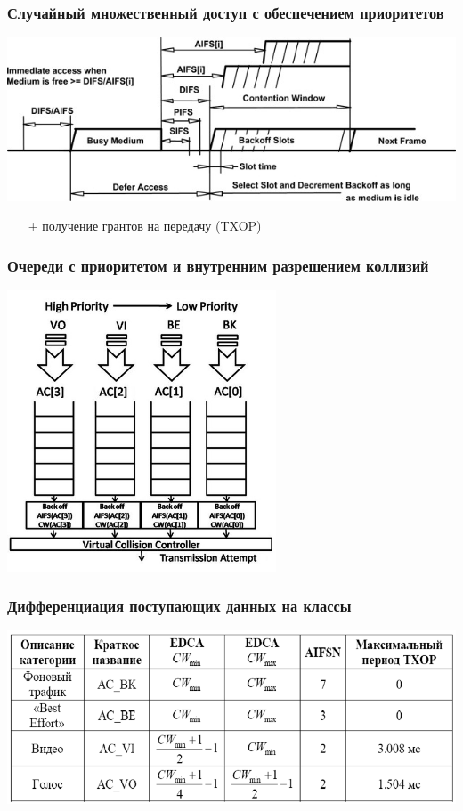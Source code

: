 \documentclass[utf8]{beamer}
\begin{document}
\begin{frame}
\frametitle{Случайный множественный доступ с обеспечением приоритетов}
\begin{center}
 \includegraphics[width=\textwidth]{pic/802-11-ifs.png}
\end{center}
\begin{itemize}
 \item [+] получение грантов на передачу (TXOP)
\end{itemize}
\end{frame}
\begin{frame}
\frametitle{Очереди с приоритетом и внутренним разрешением коллизий}
\begin{center}
 \includegraphics[width=0.6\textwidth]{pic/edca.png}
\end{center}
\end{frame}
\begin{frame}
\frametitle{Дифференциация поступающих данных на классы}
\begin{center}
 \includegraphics[width=\textwidth]{pic/access-classes.png}
\end{center}
\end{frame}
\end{document}
